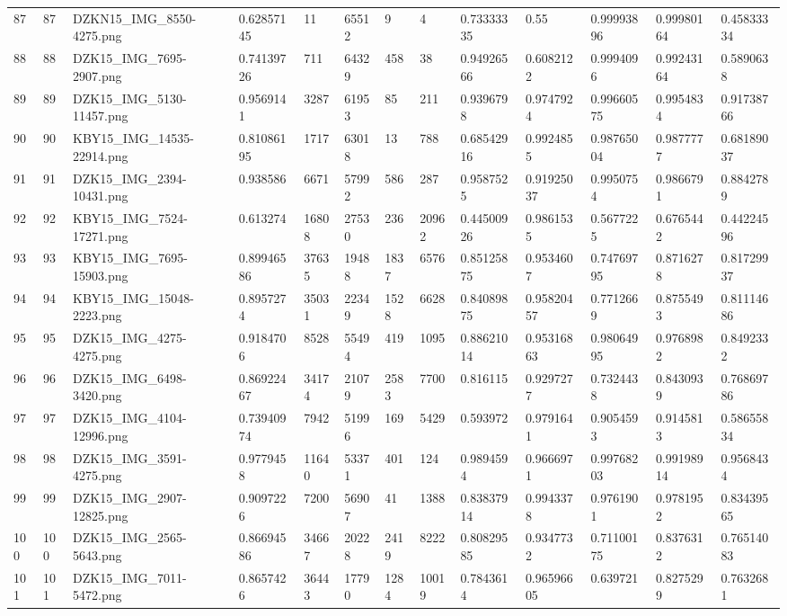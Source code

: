 \documentclass[11pt, a4paper, twoside]{report}
\begin{document}
\begin{longtable}[c]{@{}lllllllllllll@{}}
87 & 87 & DZKN15\_IMG\_8550-4275.png & 0.62857145 & 11 & 65512 & 9 & 4 & 0.73333335 & 0.55 & 0.99993896 & 0.99980164 & 0.45833334 \\
88 & 88 & DZK15\_IMG\_7695-2907.png & 0.74139726 & 711 & 64329 & 458 & 38 & 0.94926566 & 0.6082122 & 0.9994096 & 0.99243164 & 0.5890638 \\
89 & 89 & DZK15\_IMG\_5130-11457.png & 0.9569141 & 3287 & 61953 & 85 & 211 & 0.9396798 & 0.9747924 & 0.99660575 & 0.9954834 & 0.91738766 \\
90 & 90 & KBY15\_IMG\_14535-22914.png & 0.81086195 & 1717 & 63018 & 13 & 788 & 0.68542916 & 0.9924855 & 0.98765004 & 0.9877777 & 0.68189037 \\
91 & 91 & DZK15\_IMG\_2394-10431.png & 0.938586 & 6671 & 57992 & 586 & 287 & 0.9587525 & 0.91925037 & 0.9950754 & 0.9866791 & 0.8842789 \\
92 & 92 & KBY15\_IMG\_7524-17271.png & 0.613274 & 16808 & 27530 & 236 & 20962 & 0.44500926 & 0.9861535 & 0.5677225 & 0.6765442 & 0.44224596 \\
93 & 93 & KBY15\_IMG\_7695-15903.png & 0.89946586 & 37635 & 19488 & 1837 & 6576 & 0.85125875 & 0.9534607 & 0.74769795 & 0.8716278 & 0.81729937 \\
94 & 94 & KBY15\_IMG\_15048-2223.png & 0.8957274 & 35031 & 22349 & 1528 & 6628 & 0.84089875 & 0.95820457 & 0.7712669 & 0.8755493 & 0.81114686 \\
95 & 95 & DZK15\_IMG\_4275-4275.png & 0.9184706 & 8528 & 55494 & 419 & 1095 & 0.88621014 & 0.95316863 & 0.98064995 & 0.9768982 & 0.8492332 \\
96 & 96 & DZK15\_IMG\_6498-3420.png & 0.86922467 & 34174 & 21079 & 2583 & 7700 & 0.816115 & 0.9297277 & 0.7324438 & 0.8430939 & 0.76869786 \\
97 & 97 & DZK15\_IMG\_4104-12996.png & 0.73940974 & 7942 & 51996 & 169 & 5429 & 0.593972 & 0.9791641 & 0.9054593 & 0.9145813 & 0.58655834 \\
98 & 98 & DZK15\_IMG\_3591-4275.png & 0.9779458 & 11640 & 53371 & 401 & 124 & 0.9894594 & 0.9666971 & 0.99768203 & 0.99198914 & 0.9568434 \\
99 & 99 & DZK15\_IMG\_2907-12825.png & 0.9097226 & 7200 & 56907 & 41 & 1388 & 0.83837914 & 0.9943378 & 0.9761901 & 0.9781952 & 0.83439565 \\
100 & 100 & DZK15\_IMG\_2565-5643.png & 0.86694586 & 34667 & 20228 & 2419 & 8222 & 0.80829585 & 0.9347732 & 0.71100175 & 0.8376312 & 0.76514083 \\
101 & 101 & DZK15\_IMG\_7011-5472.png & 0.8657426 & 36443 & 17790 & 1284 & 10019 & 0.7843614 & 0.96596605 & 0.639721 & 0.8275299 & 0.7632681 \\

\end{longtable}
\end{document}
